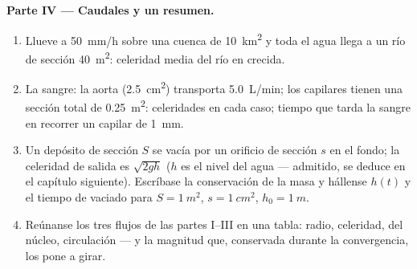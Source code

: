 \begin{problem}
\medskip
\noindent\textbf{Parte IV --- Caudales y un resumen.}
\begin{enumerate}[resume]
  \item Llueve a \qty{50}{mm/h} sobre una cuenca de \qty{10}{km^2} y toda
        el agua llega a un río de sección \qty{40}{m^2}: celeridad media
        del río en crecida.
  \item La sangre: la aorta (\qty{2.5}{cm^2}) transporta \qty{5.0}{L/min};
        los capilares tienen una sección total de \qty{0.25}{m^2}:
        celeridades en cada caso; tiempo que tarda la sangre en recorrer
        un capilar de \qty{1}{mm}.
  \item Un depósito de sección $S$ se vacía por un orificio de sección $s$
        en el fondo; la celeridad de salida es $\sqrt{2gh}$ ($h$ es el
        nivel del agua --- admitido, se deduce en el capítulo siguiente).
        Escríbase la conservación de la masa y hállense $h(t)$ y el
        tiempo de vaciado para $S = \qty{1}{m^2}$, $s = \qty{1}{cm^2}$,
        $h_0 = \qty{1}{m}$.
  \item Reúnanse los tres flujos de las partes I--III en una tabla: radio,
        celeridad,  del núcleo, circulación --- y la magnitud
        que, conservada durante la convergencia, los pone a girar.
\end{enumerate}
\end{problem}
